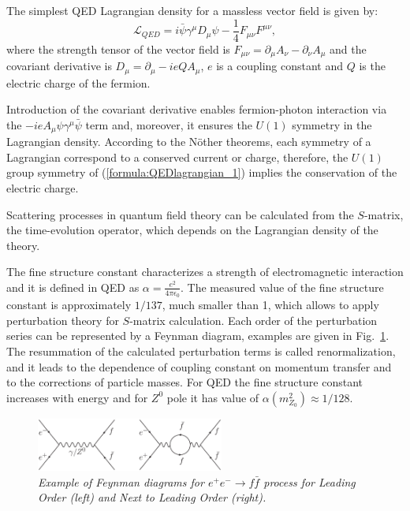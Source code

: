 The simplest QED Lagrangian density for a massless vector field is given by:
\begin{equation}
	\mathcal{L}_{QED}=i\bar{\psi}\gamma^\mu D_\mu \psi - \frac{1}{4}F_{\mu\nu}F^{\mu\nu},
    \label{formula:QEDlagrangian_1}
\end{equation}
where the strength tensor of the vector field is $F_{\mu\nu}=\partial_\mu A_\nu - \partial_\nu A_\mu$ and the covariant derivative is $D_\mu = \partial_\mu - ieQ A_\mu$, $e$ is a coupling constant and $Q$ is the electric charge of the fermion. 

Introduction of the covariant derivative enables fermion-photon interaction via the $-ieA_\mu\psi\gamma^\mu\bar{\psi}$ term and, moreover, it ensures the $U(1)$ symmetry in the Lagrangian density. According to the N\"other theorems, each symmetry of a Lagrangian correspond to a conserved current or charge, therefore, the $U(1)$ group symmetry of (\ref{formula:QEDlagrangian_1}) implies the conservation of the electric charge.

Scattering processes in quantum field theory can be calculated from the $S$-matrix, the time-evolution operator, which depends on the Lagrangian density of the theory. 

The fine structure constant characterizes a strength of electromagnetic interaction and it is defined in QED as $\alpha = \frac{e^2}{4\pi\epsilon_0}$. The measured value of the fine structure constant is approximately $1/137$, much smaller than 1, which allows to apply perturbation theory for $S$-matrix calculation. Each order of the perturbation series can be represented by a Feynman diagram, examples are given in Fig.~\ref{fig:FeynmanSM}. The resummation of the calculated perturbation terms is called renormalization, and it leads to the dependence of coupling constant on momentum transfer and to the corrections of particle masses. For QED the fine structure constant increases with energy and for $Z^0$ pole it has value of $\alpha(m_{Z_0}^2) \approx 1/128$.

\begin{figure}[h]
{\centering
    \includegraphics[width=0.55\textwidth]{graphics/FeynmanSM.eps}
    \caption{\sl Example of Feynman diagrams for $e^+e^- \to f\bar{f}$ process for Leading Order (left) and Next to Leading Order (right). }
    \label{fig:FeynmanSM}
  }
\end{figure}

